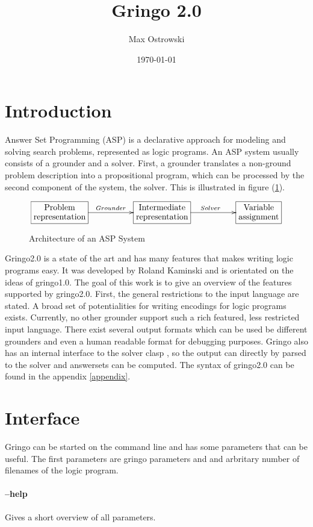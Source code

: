 \documentclass[a4paper,10pt]{article}
\author{Max Ostrowski}
\title{Gringo 2.0}
\date{\today}
\begin{document}
\maketitle
\tableofcontents
\section{Introduction}
Answer Set Programming (ASP) \cite{baral02a} is a declarative approach for modeling and solving search problems, represented as logic programs.
An ASP system usually consists of a grounder and a solver.
First, a grounder translates a non-ground problem description into a propositional program, which can be processed by the second component of the system, the solver. This is illustrated in figure (\ref{fig:ASP}).
\begin{figure}[h]
\[
\xymatrix{*+[F]\txt{Problem\\representation}\ar[rr]^{Grounder}&&
		*+[F]\txt{Intermediate\\ representation} \ar[rr]^{Solver}&&
		*+[F]\txt{Variable\\ assignment}}
\]
\caption{Architecture of an ASP System}
\label{fig:ASP}
\end{figure}
Gringo2.0 is a state of the art and has many features that makes writing logic programs easy.
It was developed by Roland Kaminski and is orientated on the ideas of gringo1.0.
The goal of this work is to give an overview of the features supported by gringo2.0. First, the general restrictions to the input language are stated. A broad set of potentialities for writing encodings for logic programs exists. Currently, no other grounder support such a rich featured, less restricted input language.
There exist several output formats which can be used be different grounders and even a human readable format for debugging purposes.
Gringo also has an internal interface to the solver clasp \cite{gekanesc07b}, so the output can directly by parsed to the solver and answersets can be computed.
The syntax of gringo2.0 can be found in the appendix \ref{appendix}.

\section{Interface}
Gringo can be started on the command line and has some parameters that can be useful.
The first parameters are gringo parameters and and arbritary number of filenames of the logic program.
\paragraph{--help}
Gives a short overview of all parameters.
\end{document}
